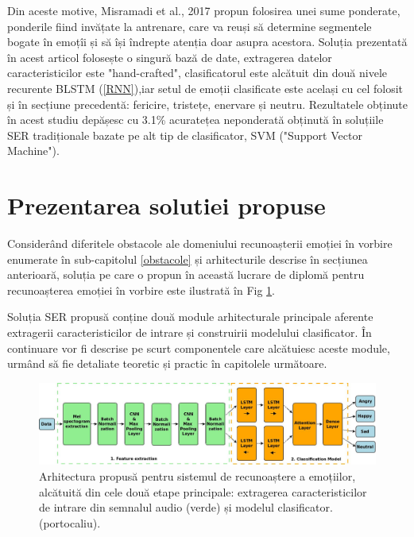 \documentclass[a4paper,12pt]{book}
\newcounter{Figcount}
\begin{document}
					 Din aceste motive, Misramadi et al., 2017 \cite{misramadi} propun folosirea unei sume ponderate, ponderile fiind invățate la antrenare, care va reuși să determine segmentele bogate în emoțîi și să își îndrepte atenția doar asupra acestora. 					 
					 Soluția prezentată în acest articol folosește o singură bază de date, extragerea datelor caracteristicilor este "hand-crafted", clasificatorul este alcătuit din două nivele recurente BLSTM (\ref{RNN}),iar setul de emoții clasificate este același cu cel folosit și în secțiune precedentă: fericire, tristețe, enervare și neutru. Rezultatele obținute în acest studiu depășesc cu 3.1\% acuratețea neponderată obținută în soluțiile SER tradiționale bazate pe alt tip de clasificator, SVM ("Support Vector Machine").
					 
				\section{Prezentarea solutiei propuse} \label{solutie}
					Considerând diferitele obstacole ale domeniului recunoașterii emoției în vorbire enumerate în sub-capitolul \ref{obstacole} și arhitecturile descrise în secțiunea anterioară, soluția pe care o propun în această lucrare de diplomă pentru recunoașterea emoției în vorbire este ilustrată în Fig \ref{fig:model}. \par
					Soluția SER propusă conține două module arhitecturale principale aferente extragerii caracteristicilor de intrare și construirii modelului clasificator. În continuare vor fi descrise pe scurt componentele care alcătuiesc aceste module, urmând să fie detaliate teoretic și practic în capitolele următoare. \par
						
					
					\begin{figure}[h]
						\noindent
						\hspace*{-1cm}
						\includegraphics[scale=0.290]{Sistem_Diagram}
						\caption{Arhitectura propusă pentru sistemul de recunoaștere a emoțiilor, alcătuită din cele două etape principale: extragerea caracteristicilor de intrare din semnalul audio (verde) și modelul clasificator. (portocaliu).}
						\label{fig:model}
						
					\end{figure}
				
\end{document}
